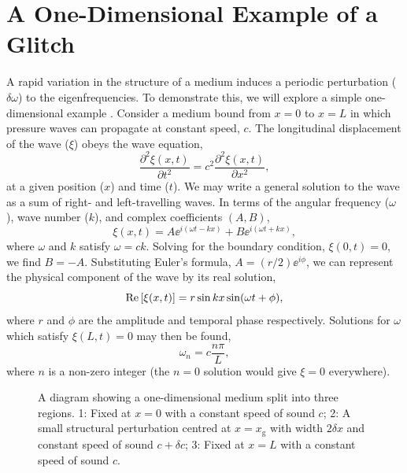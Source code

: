 \section[1D Glitch Example]{A One-Dimensional Example of a Glitch}\label{sec:1d-glitch}

\newcommand*{\glitch}{\ensuremath{{\mathrm{g}}}}

A rapid variation in the structure of a medium induces a periodic perturbation (\(\delta\omega\)) to the eigenfrequencies. To demonstrate this, we will explore a simple one-dimensional example \citep[similar to that of][]{Verner2005}. Consider a medium bound from \(x=0\) to \(x=L\) in which pressure waves can propagate at constant speed, \(c\). The longitudinal displacement of the wave (\(\xi\)) obeys the wave equation,
%
\begin{equation}
    \frac{\partial^2\xi(x, t)}{\partial t^2} = c^2 \frac{\partial^2\xi(x, t)}{\partial x^2},
\end{equation}
%
at a given position (\(x\)) and time (\(t\)). We may write a general solution to the wave as a sum of right- and left-travelling waves. In terms of the angular frequency (\(\omega\)), wave number (\(k\)), and complex coefficients \((A, B)\),
%
\begin{equation}
    \xi(x, t) = A \ee^{i (\omega t - k x)} + B \ee^{i (\omega t + k x)},
\end{equation}
%
where \(\omega\) and \(k\) satisfy \(\omega = c k\). Solving for the boundary condition, \(\xi(0, t) = 0\), we find \(B = - A\). Substituting Euler's formula, \(A = (r/2) \ee^{i\phi}\), we can represent the physical component of the wave by its real solution,
%
\begin{equation}
    {\mathrm{Re}}\left[\xi(x, t)\right] = r \sin k x \sin(\omega t + \phi),
\end{equation}
%
where \(r\) and \(\phi\) are the amplitude and temporal phase respectively. Solutions for \(\omega\) which satisfy \(\xi(L, t)=0\) may then be found,
%
\begin{equation}
    \omega_n = c \frac{n \pi}{L}, \label{eq:omega-n}
\end{equation}
%
where \(n\) is a non-zero integer (the \(n=0\) solution would give \(\xi=0\) everywhere).

\begin{figure}[!tb]
    \centering
    
    \caption[A diagram showing a one-dimensional medium with a small structural perturbation.]{A diagram showing a one-dimensional medium split into three regions. 1: Fixed at \(x=0\) with a constant speed of sound \(c\); 2: A small structural perturbation centred at \(x=x_\glitch\) with width \(2\delta x\) and constant speed of sound \(c + \delta c\); 3: Fixed at \(x=L\) with a constant speed of sound \(c\).}
    \label{fig:1d-diagram}
\end{figure}

